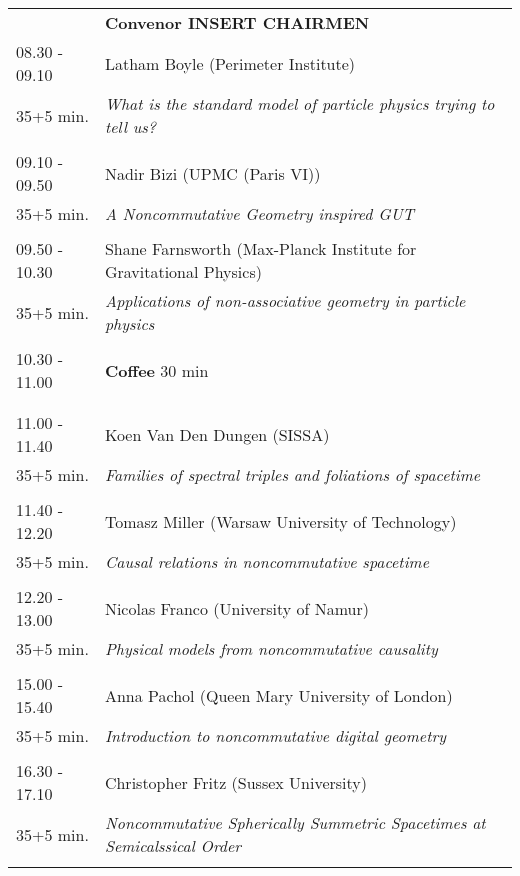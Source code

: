\begin{longtable}{p{3cm}p{13cm}}
&\hfill {\bf Convenor INSERT CHAIRMEN }\\ 
08.30 - 09.10 & Latham Boyle (Perimeter Institute)\\ 
35+5 min. & {\it What is the standard model of particle physics trying to tell us?}\\ 
 & \\ 
09.10 - 09.50 & Nadir Bizi (UPMC (Paris VI))\\ 
35+5 min. & {\it A Noncommutative Geometry inspired GUT}\\ 
 & \\ 
09.50 - 10.30 & Shane Farnsworth (Max-Planck Institute for Gravitational Physics)\\ 
35+5 min. & {\it Applications of non-associative geometry in particle physics}\\ 
 & \\ 
10.30 - 11.00 & {\bf Coffee} \hfill 30 min \\ 
 & \\ 
 & \\ 
11.00 - 11.40 & Koen Van Den Dungen (SISSA)\\ 
35+5 min. & {\it Families of spectral triples and foliations of spacetime}\\ 
 & \\ 
11.40 - 12.20 & Tomasz Miller (Warsaw University of Technology)\\ 
35+5 min. & {\it Causal relations in noncommutative spacetime}\\ 
 & \\ 
12.20 - 13.00 & Nicolas Franco (University of Namur)\\ 
35+5 min. & {\it Physical models from noncommutative causality}\\ 
 & \\ 
15.00 - 15.40 & Anna Pachol (Queen Mary University of London)\\ 
35+5 min. & {\it Introduction to noncommutative digital geometry}\\ 
 & \\ 
16.30 - 17.10 & Christopher Fritz (Sussex University)\\ 
35+5 min. & {\it Noncommutative Spherically Summetric Spacetimes at Semicalssical Order}\\ 
 & \\ 
\end{longtable}

